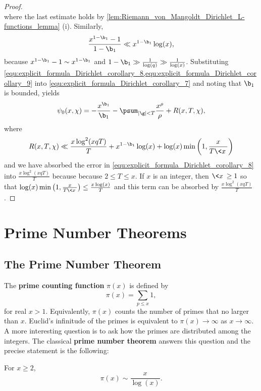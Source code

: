 \begin{proof}
\begin{equation}
        \end{equation}
        where the last estimate holds by \cref{lem:Riemann_von_Mangoldt_Dirichlet_L-functions_lemma} (i). Similarly,
        \begin{equation}\label{equ:explicit_formula_Dirichlet_corollary_9}
          \frac{x^{1-\b_{1}}-1}{1-\b_{1}} \ll x^{1-\b_{1}}\log(x),
        \end{equation}
        because $x^{1-\b_{1}}-1 \sim x^{1-\b_{1}}$ and $1-\b_{1} \gg \frac{1}{\log(q)} \gg \frac{1}{\log(x)}$. Substituting \cref{equ:explicit_formula_Dirichlet_corollary_8,equ:explicit_formula_Dirichlet_corollary_9} into \cref{equ:explicit_formula_Dirichlet_corollary_7} and noting that $\b_{1}$ is bounded, yields
        \begin{equation}\label{equ:explicit_formula_Dirichlet_corollary_10}
          \psi_{0}(x,\chi) = -\frac{x^{\b_{1}}}{\b_{1}}-\psum_{|\g| < T}\frac{x^{\rho}}{\rho}+R(x,T,\chi),
        \end{equation}
        where
        \[
          R(x,T,\chi) \ll \frac{x\log^{2}(xqT)}{T}+x^{1-\b_{1}}\log(x)+\log(x)\min\left(1,\frac{x}{T\<x\>}\right)
        \]
        and we have absorbed the error in \cref{equ:explicit_formula_Dirichlet_corollary_8} into $\frac{x\log^{2}(xqT)}{T}$ because because $2 \le T \le x$. If $x$ is an integer, then $\<x\> \ge 1$ so that $\log(x)\min\left(1,\frac{x}{T\<x\>}\right) \le \frac{x\log(x)}{T}$ and this term can be absorbed by $\frac{x\log^{2}(xqT)}{T}$.
      \end{proof}
  \section{Prime Number Theorems}
    \subsection*{The Prime Number Theorem}
      The \textbf{prime counting function} $\pi(x)$ is defined by
      \[
        \pi(x) = \sum_{p \le x}1,
      \]
      for real $x > 1$. Equivalently, $\pi(x)$ counts the number of primes that no larger than $x$. Euclid's infinitude of the primes is equivalent to $\pi(x) \to \infty$ as $x \to \infty$. A more interesting question is to ask how the primes are distributed among the integers. The classical \textbf{prime number theorem} answers this question and the precise statement is the following:

      \begin{theorem}
        For $x \ge 2$,
        \[
          \pi(x) \sim \frac{x}{\log(x)}.
        \]
      \end{theorem}

